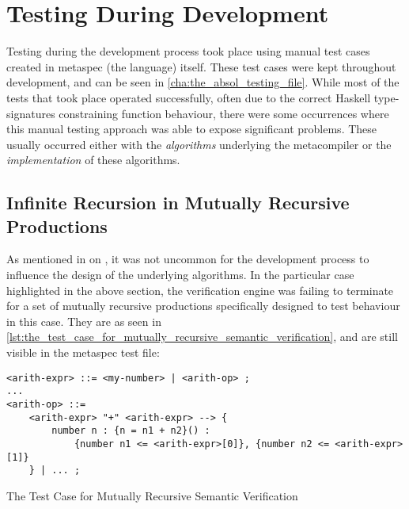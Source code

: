 

\section{Testing During Development} %
\label{sec:testing_during_development}
Testing during the development process took place using manual test cases created in \gls{metaspec} (the language) itself.
These test cases were kept throughout development, and can be seen in \autoref{cha:the_absol_testing_file}.
While most of the tests that took place operated successfully, often due to the correct Haskell type-signatures constraining function behaviour, there were some occurrences where this manual testing approach was able to expose significant problems.
These usually occurred either with the \textit{algorithms} underlying the metacompiler or the \textit{implementation} of these algorithms.

\subsection{Infinite Recursion in Mutually Recursive Productions} %
\label{sub:infinite_recursion_in_mutually_recursive_productions}
As mentioned in  on , it was not uncommon for the development process to influence the design of the underlying algorithms.
In the particular case highlighted in the above section, the verification engine was failing to terminate for a set of mutually recursive productions specifically designed to test behaviour in this case. 
They are as seen in \autoref{lst:the_test_case_for_mutually_recursive_semantic_verification}, and are still visible in the metaspec test file:
\begin{listing}[!htb]
\begin{verbatim}
<arith-expr> ::= <my-number> | <arith-op> ;
...
<arith-op> ::= 
    <arith-expr> "+" <arith-expr> --> {
        number n : {n = n1 + n2}() :
            {number n1 <= <arith-expr>[0]}, {number n2 <= <arith-expr>[1]}
    } | ... ;
\end{verbatim}
\caption{The Test Case for Mutually Recursive Semantic Verification}
\label{lst:the_test_case_for_mutually_recursive_semantic_verification}
\end{listing}

